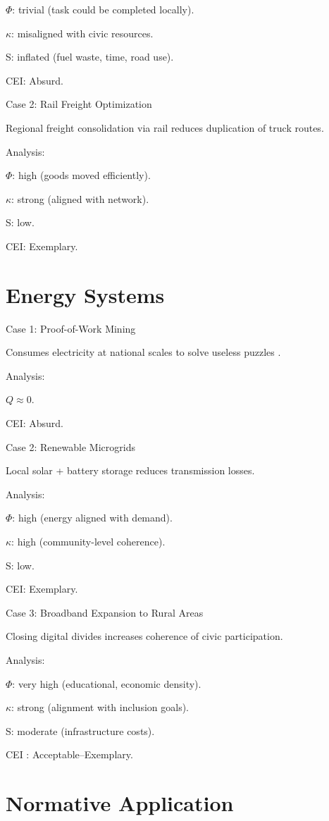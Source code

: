 \documentclass{book}
\begin{document}
\(\Phi\): trivial (task could be completed locally).

\(\kappa\): misaligned with civic resources.

S: inflated (fuel waste, time, road use).

CEI: Absurd.

Case 2: Rail Freight Optimization

Regional freight consolidation via rail reduces duplication of truck routes.

Analysis:

\(\Phi\): high (goods moved efficiently).

\(\kappa\): strong (aligned with network).

S: low.

CEI: Exemplary.

\section{Energy Systems}

Case 1: Proof-of-Work Mining

Consumes electricity at national scales to solve useless puzzles \cite{nakamoto2008}.

Analysis:

\( Q \approx 0 \).

CEI: Absurd.

Case 2: Renewable Microgrids

Local solar + battery storage reduces transmission losses.

Analysis:

\(\Phi\): high (energy aligned with demand).

\(\kappa\): high (community-level coherence).

S: low.

CEI: Exemplary.

Case 3: Broadband Expansion to Rural Areas

Closing digital divides increases coherence of civic participation.

Analysis:

\(\Phi\): very high (educational, economic density).

\(\kappa\): strong (alignment with inclusion goals).

S: moderate (infrastructure costs).

CEI : Acceptable–Exemplary.

\section{Normative Application}
\end{document}
